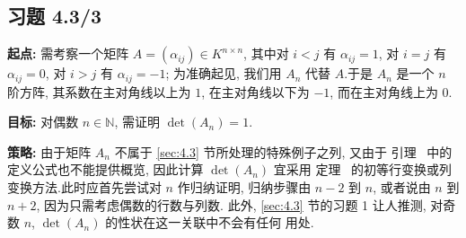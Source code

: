 \subsection*{习题 4.3/3}

\noindent\textbf{起点:} 需考察一个矩阵 $A = (\alpha_{ij}) \in K^{n \times n}$, 其中对
$i < j$ 有 $\alpha_{ij} = 1$, 对 $i = j$ 有 $\alpha_{ij} = 0$, 对 $i > j$ 有
$\alpha_{ij} = -1$; 为准确起见, 我们用 $A_n$ 代替 $A$.于是 $A_n$ 是一个 $n$ 阶方阵,
其系数在主对角线以上为 $1$, 在主对角线以下为 $-1$, 而在主对角线上为 $0$.

\noindent\textbf{目标:} 对偶数 $n \in \mathbb{N}$, 需证明 $\det(A_n) = 1$.

\noindent\textbf{策略:} 由于矩阵 $A_n$ 不属于 \ref{sec:4.3} 节所处理的特殊例子之列, 又由于
引理~ 中的定义公式也不能提供概览, 因此计算 $\det(A_n)$ 宜采用
定理~ 的初等行变换或列变换方法.此时应首先尝试对 $n$ 作归纳证明,
归纳步骤由 $n - 2$ 到 $n$, 或者说由 $n$ 到 $n + 2$, 因为只需考虑偶数的行数与列数.
此外, \ref{sec:4.3} 节的习题 1 让人推测, 对奇数 $n$, $\det(A_n)$ 的性状在这一关联中不会有任何
用处.

